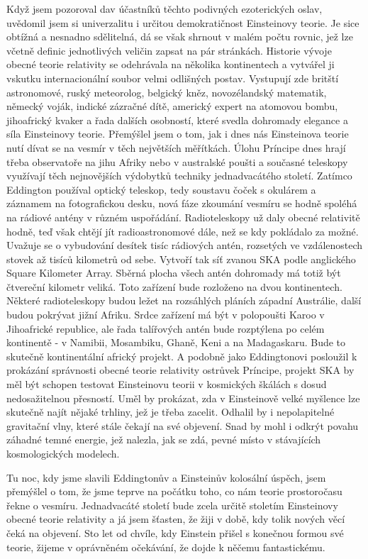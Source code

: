   Když jsem pozoroval dav účastníků těchto podivných ezoterických oslav, uvědomil jsem si
  univerzalitu i určitou demokratičnost Einsteinovy teorie. Je sice obtížná a nesnadno sdělitelná,
  dá se však shrnout v malém počtu rovnic, jež lze včetně definic jednotlivých veličin zapsat na pár
  stránkách. Historie vývoje obecné teorie relativity se odehrávala na několika kontinentech a
  vytvářel ji vskutku internacionální soubor velmi odlišných postav. Vystupují zde britští
  astronomové, ruský meteorolog, belgický kněz, novozélandský matematik, německý voják, indické
  zázračné dítě, americký expert na atomovou bombu, jihoafrický kvaker a řada dalších osobností,
  které svedla dohromady elegance a síla Einsteinovy teorie. Přemýšlel jsem o tom, jak i dnes nás
  Einsteinova teorie nutí dívat se na vesmír v těch největších měřítkách. Úlohu Príncipe dnes hrají
  třeba observatoře na jihu Afriky nebo v australské poušti a současné teleskopy využívají těch
  nejnovějších výdobytků techniky jednadvacátého století. Zatímco Eddington používal optický
  teleskop, tedy soustavu čoček s okulárem a záznamem na fotografickou desku, nová fáze zkoumání
  vesmíru se hodně spoléhá na rádiové antény v různém uspořádání. Radioteleskopy už daly obecné
  relativitě hodně, teď však chtějí jít radioastronomové dále, než se kdy pokládalo za možné.
  Uvažuje se o vybudování desítek tisíc rádiových antén, rozsetých ve vzdálenostech stovek až tisíců
  kilometrů od sebe. Vytvoří tak síť zvanou SKA podle anglického Square Kilometer Array. Sběrná
  plocha všech antén dohromady má totiž být čtvereční kilometr veliká. Toto zařízení bude rozloženo
  na dvou kontinentech. Některé radioteleskopy budou ležet na rozsáhlých pláních západní Austrálie,
  další budou pokrývat jižní Afriku. Srdce zařízení má být v polopoušti Karoo v Jihoafrické
  republice, ale řada talířových antén bude rozptýlena po celém kontinentě - v Namibii, Mosambiku,
  Ghaně, Keni a na Madagaskaru. Bude to skutečně kontinentální africký projekt. A podobně jako
  Eddingtonovi posloužil k prokázání správnosti obecné teorie relativity ostrůvek Príncipe, projekt
  SKA by měl být schopen testovat Einsteinovu teorii v kosmických škálách s dosud nedosažitelnou
  přesností. Uměl by prokázat, zda v Einsteinově velké myšlence lze skutečně najít nějaké trhliny,
  jež je třeba zacelit. Odhalil by i nepolapitelné gravitační vlny, které stále čekají na své
  objevení. Snad by mohl i odkrýt povahu záhadné temné energie, jež nalezla, jak se zdá, pevné místo
  v stávajících kosmologických modelech. 
  
  Tu noc, kdy jsme slavili Eddingtonův a Einsteinův kolosální úspěch, jsem přemýšlel o tom, že jsme
  teprve na počátku toho, co nám teorie prostoročasu řekne o vesmíru. Jednadvacáté století bude
  zcela určitě stoletím Einsteinovy obecné teorie relativity a já jsem šťasten, že žiji v době, kdy
  tolik nových věcí čeká na objevení. Sto let od chvíle, kdy Einstein přišel s konečnou formou své
  teorie, žijeme v oprávněném očekávání, že dojde k něčemu fantastickému.
